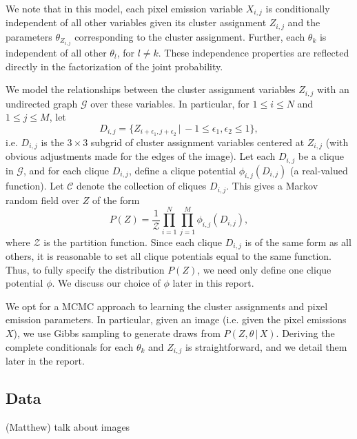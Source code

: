 \documentclass[12pt]{article}
\begin{document}
We note that in this model, each pixel emission variable $X_{i,j}$ is conditionally
independent of all other
variables given its cluster assignment $Z_{i,j}$ and the parameters $\theta_{Z_{i,j}}$
corresponding to the cluster assignment. Further, each $\theta_k$ is independent of all
other $\theta_l$, for $l \neq k$. These independence properties are reflected
directly in the factorization of the joint probability.

We model the relationships between the cluster assignment variables $Z_{i,j}$ with an undirected graph
$\mathcal{G}$ over these variables.
In particular, for $1 \leq i \leq N$ and $1 \leq j \leq M$, let
\[
D_{i,j} = \{Z_{i+\epsilon_1,j+\epsilon_2}\,|\,-1 \leq \epsilon_1, \epsilon_2 \leq 1\},
\]
i.e. $D_{i,j}$ is the $3\times 3$ subgrid of cluster assignment variables centered at $Z_{i,j}$
(with obvious adjustments made for the edges of the image). Let each $D_{i,j}$ be a clique in
$\mathcal{G}$, and for each clique $D_{i,j}$, define a clique potential $\phi_{i,j}(D_{i,j})$
(a real-valued function).
Let $\mathcal{C}$ denote the collection of cliques $D_{i,j}$.
This gives a Markov random field over $Z$ of the form
\[
P(Z) = \frac{1}{\mathcal{Z}}\prod_{i=1}^N\prod_{j=1}^M \phi_{i,j}(D_{i,j}),
\]
where $\mathcal{Z}$ is the partition function.
Since each clique $D_{i,j}$ is of the same form as all others, 
it is reasonable to set all clique potentials equal to the same function.
Thus, to fully specify the distribution $P(Z)$, we need only define one clique potential $\phi$.
We discuss our choice of $\phi$ later in this report.

We opt for a MCMC approach to learning the cluster assignments and pixel emission parameters.
In particular, given an image (i.e. given the pixel emissions $X$), we use Gibbs sampling
to generate draws from $P(Z,\theta\, |\, X)$. 
Deriving the complete conditionals for each $\theta_k$ and $Z_{i,j}$ is straightforward,
and we detail them later in the report.

\subsection*{Data}(Matthew)
talk about images
\end{document}
